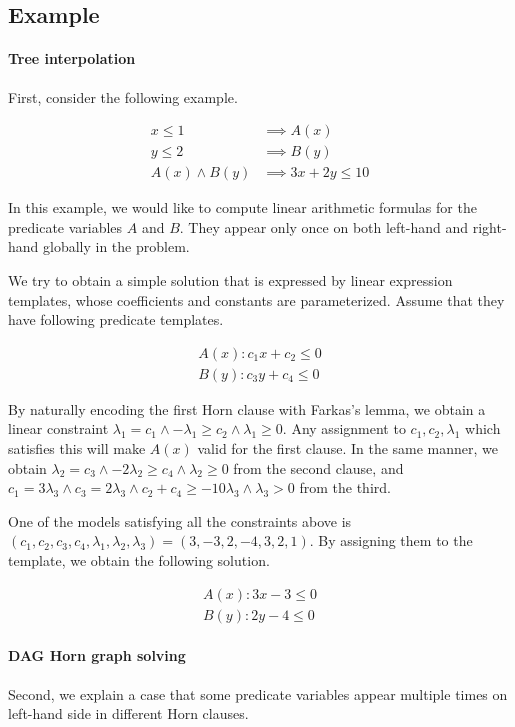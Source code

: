 \documentclass[a4paper,12pt]{article}
\begin{document}
\subsection{Example}

\paragraph {Tree interpolation}
First, consider the following example.

\begin{align*}
x \leq 1 & \implies A(x) \\
y \leq 2 & \implies B(y) \\
A(x) \wedge B(y) & \implies 3x+2y \leq 10
\end{align*}

In this example, we would like to compute linear arithmetic
formulas for the predicate variables $A$ and $B$.
They appear only once on both left-hand and right-hand globally in the problem.

We try to obtain a simple solution that is expressed by linear expression
templates, whose coefficients and constants are parameterized. Assume
that they have following predicate templates.

\begin{align*}
A(x) : c_1 x + c_2 \leq 0 \\
B(y) : c_3 y + c_4 \leq 0
\end{align*}

By naturally encoding the first Horn clause with Farkas's lemma,
we obtain a linear constraint
$ \lambda_1 = c_1 \wedge - \lambda_1 \geq c_2 \wedge \lambda_1 \geq 0 $.
Any assignment to $ c_1, c_2, \lambda_1 $ which satisfies this will make $A(x)$
valid for the first clause. In the same manner, we obtain
$ \lambda_2 = c_3 \wedge - 2 \lambda_2 \geq c_4 \wedge \lambda_2 \geq 0 $
from the second clause, and
$ c_1 = 3 \lambda_3 \wedge c_3 = 2 \lambda_3 \wedge c_2 + c_4 \geq -10 \lambda_3 \wedge \lambda_3 > 0 $
from the third.

One of the models satisfying all the constraints above is
$( c_1, c_2, c_3, c_4, \lambda_1, \lambda_2, \lambda_3 ) = (3, -3, 2, -4, 3, 2, 1)$.
By assigning them to the template, we obtain the following solution.

\begin{align*}
A(x) : 3 x - 3 \leq 0 \\
B(y) : 2 y - 4 \leq 0
\end{align*}

\paragraph {DAG Horn graph solving}
Second, we explain a case that some predicate variables appear
multiple times on left-hand side in different Horn clauses.
\end{document}
